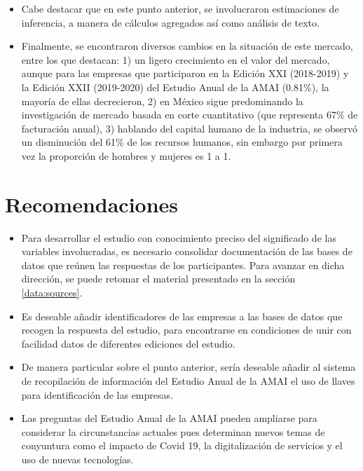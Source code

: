 \begin{itemize}
    \item Cabe destacar que en este punto anterior, se involucraron estimaciones de inferencia, a manera de cálculos agregados así como análisis de texto.
    
    \item Finalmente, se encontraron diversos cambios en la situación de este mercado, entre los que destacan: 1) un ligero crecimiento en el valor del mercado, aunque para las empresas que participaron en la Edición  XXI  (2018-2019)  y  la  Edición  XXII (2019-2020) del Estudio Anual de la AMAI (0.81\%), la mayoría de ellas decrecieron, 2) en México sigue predominando la investigación de  mercado  basada  en  corte  cuantitativo (que representa 67\% de facturación anual), 3) hablando del capital humano de la industria, se observó un disminución del 61\% de los recursos humanos, sin embargo por primera vez la proporción de hombres y mujeres es 1 a 1. 
    
\end{itemize}


\section*{Recomendaciones}

\begin{itemize}

    \item Para desarrollar el estudio con conocimiento preciso del significado de las variables involucradas, es necesario consolidar documentación de las bases de datos que reúnen las respuestas de los participantes. Para avanzar en dicha dirección, se puede retomar el material presentado en la sección \ref{data:sources}.

    \item Es deseable añadir identificadores de las empresas a las bases de datos que recogen la respuesta del estudio, para encontrarse en condiciones de unir con facilidad datos de diferentes ediciones del estudio.
    
     \item De manera particular sobre el punto anterior, sería deseable añadir al sistema de recopilación de información del Estudio Anual de la AMAI el uso  de llaves para identificación de las empresas.
    
    \item Las preguntas del Estudio Anual de la AMAI pueden ampliarse para considerar la circunstancias actuales pues determinan nuevos temas de conyuntura como el impacto de Covid 19, la digitalización de servicios y el uso de nuevas tecnologías.
    
\end{itemize}
